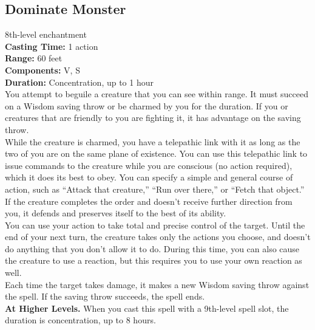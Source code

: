 \documentclass[11pt, A4paper, english]{article}
\begin{document}
		\subsection{Dominate Monster}
8th-level enchantment \\
\textbf{Casting Time:} 1 action \\
\textbf{Range:} 60 feet \\
\textbf{Components:} V, S \\
\textbf{Duration:} Concentration, up to 1 hour \\
You attempt to beguile a creature that you can see within range. It must succeed on a Wisdom  saving throw or be charmed by you for the duration. If you or creatures that are friendly to you are fighting it, it has advantage on the saving throw. \\
While the creature is charmed, you have a telepathic link with it as long as the two of you are on the same plane of existence. You can use this telepathic link to issue commands to the creature while you are conscious (no action required), which it does its best to obey. You can specify a simple and general course of action, such as “Attack that creature,” “Run over there,” or “Fetch that object.” If the creature completes the order and doesn’t receive further direction from you, it defends and preserves itself to the best of its ability. \\
You can use your action to take total and precise control of the target. Until the end of your next turn, the creature takes only the actions you choose, and doesn’t do anything that you don’t allow it to do. During this time, you can also cause the creature to use a reaction, but this requires you to use your own reaction as well. \\
Each time the target takes damage, it makes a new Wisdom  saving throw against the spell. If the saving throw succeeds, the spell ends. \\
\textbf{At Higher Levels.} When you cast this spell with a 9th-level spell slot, the duration is concentration, up to 8 hours.
\end{document}
